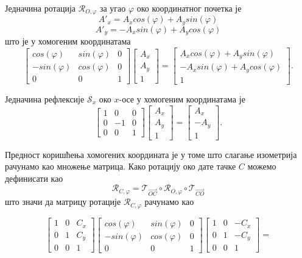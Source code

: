 \documentclass[12pt]{article}
\begin{document}
Једначина ротација $\mathcal{R}_{O,\varphi}$ за угао $\varphi$ око координатног почетка  је $$A'_x = A_x  cos(\varphi) +  A_y  sin(\varphi)$$ 
$$A'_y = -A_x  sin(\varphi) + A_y  cos(\varphi)$$
што је у хомогеним координатама
\[\begin{bmatrix}cos(\varphi) & sin(\varphi) & 0\\ -sin(\varphi) & cos(\varphi)&0 \\ 0 & 0 & 1\end{bmatrix} \begin{bmatrix}A_x\\ A_y\\1\end{bmatrix} = 
\begin{bmatrix}A_x  cos(\varphi) +  A_y  sin(\varphi)\\ -A_x  sin(\varphi) + A_y  cos(\varphi)\\1\end{bmatrix}.\]

Једначина рефлексије $\mathcal{S}_x$ око $x$-осе   у хомогеним координатама је
\[\begin{bmatrix}1 & 0 & 0\\ 0 & -1&0 \\ 0 & 0 & 1\end{bmatrix} \begin{bmatrix}A_x\\ A_y\\1\end{bmatrix} = 
\begin{bmatrix}A_x \\ -A_y\\1\end{bmatrix}.\]

Предност  коришћења  хомогених  координата  је  у  томе  што  слагање  изометрија  рачунамо  као множење матрица. Како ротацију око дате тачке $C$ можемо дефинисати као
$$\mathcal{R}_{C,\varphi} = \mathcal{T}_{\vec{OC}} \circ \mathcal{R}_{O,\varphi} \circ \mathcal{T}_{\vec{CO}}$$
што значи да матрицу ротације $\mathcal{R}_{C,\varphi}$ рачунамо као

\[\begin{bmatrix}1 & 0 & C_x\\ 0 & 1&C_y \\ 0 & 0 & 1\end{bmatrix}
\begin{bmatrix}cos(\varphi) & sin(\varphi) & 0\\ -sin(\varphi) & cos(\varphi)&0 \\ 0 & 0 & 1\end{bmatrix}
\begin{bmatrix}1 & 0 & -C_x\\ 0 & 1&-C_y \\ 0 & 0 & 1\end{bmatrix}
=  \]
\end{document}
